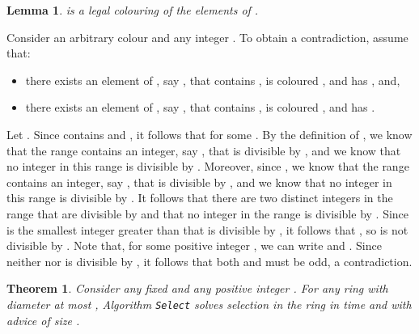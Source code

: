 \documentclass[11pt]{article}
\newtheorem{theorem}{Theorem}[section]
\newtheorem{lemma}{Lemma}[section]
\newcommand{\qed}{\hfill  \bigbreak}
\newenvironment{proof}{\noindent {\bf Proof.}}{\qed}
\begin{document}
\begin{lemma}\label{isLegal}
 is a legal colouring of the elements of .
\end{lemma}
\begin{proof}
Consider an arbitrary colour  and any integer . To obtain a contradiction, assume that: 
\begin{itemize}
\item there exists an element of , say , that contains , is coloured , and has , and,
\item there exists an element of , say , that contains , is coloured , and has .
\end{itemize}
Let .
Since  contains  and , it follows that  for some . By the definition of , we know that the range  contains an integer, say , that is divisible by , and we know that no integer in this range is divisible by . Moreover, since , we know that the range  contains an integer, say , that is divisible by , and we know that no integer in this range is divisible by . It follows that there are two distinct integers  in the range  that are divisible by  and that no integer in the range  is divisible by . Since  is the smallest integer greater than  that is divisible by , it follows that , so  is not divisible by . Note that, for some positive integer , we can write  and . Since neither  nor  is divisible by , it follows that both  and  must be odd, a contradiction.
\end{proof}


\begin{theorem}\label{ub}
Consider any fixed  and any positive integer . For any ring  with diameter at most ,
Algorithm {\tt Select} solves selection in the ring  
in time  and with advice of size .
\end{theorem}
\end{document}

